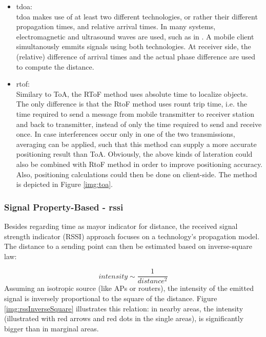 \begin{itemize}
	\item \ac{tdoa}:\\
	\ac{tdoa} makes use of at least two different technologies, or rather their different propagation times, and relative arrival times. In many systems, electromagnetic and ultrasound waves are used, such as in \cite{otoaUltrasound}. A mobile client simultanously emmits signals using both technologies. At receiver side, the (relative) difference of arrival times and the actual phase difference are used to compute the distance. \cite{mitILSystem}
	
	\item \ac{rtof}:\\
	Similary to ToA, the RToF method uses absolute time to localize objects. The only difference is that the RtoF method uses rount trip time, i.e. the time required to send a message from mobile transmitter to receiver station and back to transmitter, instead of only the time required to send and receive once. 
	In case interferences occur only in one of the two transmissions, averaging can be applied, such that this method can supply a more accurate positioning result than ToA. Obviously, the above kinds of lateration could also be combined with RtoF method in order to improve positioning accuracy. Also, positioning calculations could then be done on client-side. The method is depicted in Figure \ref{img:toa}.\\
\end{itemize}

\subsubsection{Signal Property-Based - \ac{rssi}}

Besides regarding time as mayor indicator for distance, the received signal strength indicator (RSSI) approach focuses on a technology's propagation model. The distance to a sending point can then be estimated based on inverse-square law:

\[intensity \sim \frac{1}{distance^{2}}\]
Assuming an isotropic source (like APs or routers), the intensity of the emitted signal is inversely proportional to the square of the distance. Figure \ref{img:rssInverseSquare} illustrates this relation: in nearby areas, the intensity (illustrated with red arrows and red dots in the single areas), is significantly bigger than in marginal areas.	


